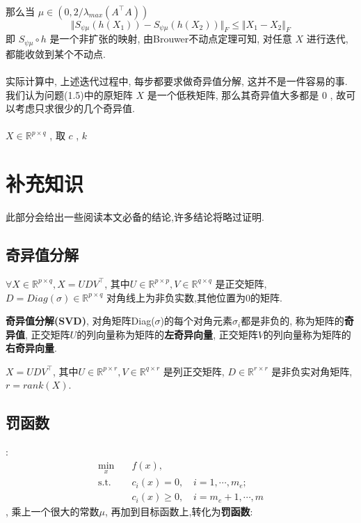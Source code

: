 \documentclass[UTF8]{ctexart}
\newcommand{\s}{\quad}
\renewcommand{\b}{\textbf}
\newcommand{\p}{\paragraph{}\s}
\newcommand{\sect}{\section}
\newcommand{\ssect}{\subsection}
\newcommand{\equSplit}[1]{\begin{equation}\begin{split}#1\end{split}\end{equation}}
\newcommand{\Tst}{\text{s.t.}\s}
\newcommand{\Real}[1]{\mathbb{R}^{#1}}
\numberwithin{equation}{section}
\begin{document}
		\paragraph{}\quad 那么当 $\mu \in (0, 2/\lambda_{max}(A ^\top A))$
			\begin{equation}
				\Vert{S_{\psi \mu}(h(X_1)) - S_{\psi \mu}(h(X_2))}\Vert_F \le \Vert{X_1 - X_2}\Vert_F
			\end{equation}
			即 $S_{\psi \mu} \circ h$ 是一个非扩张的映射, 由Brouwer不动点定理可知, 对任意 $X$ 进行迭代, 都能收敛到某个不动点.

		\paragraph{}\quad 实际计算中, 上述迭代过程中, 每步都要求做奇异值分解, 这并不是一件容易的事. 我们认为问题(1.5)中的原矩阵 $X$ 是一个低秩矩阵, 那么其奇异值大多都是 $0$ , 故可以考虑只求很少的几个奇异值.

		\paragraph{}\quad $X \in \Real{p \times q}$ , 取 $c$ , $k$ 



		
	\sect{补充知识}
		此部分会给出一些阅读本文必备的结论,许多结论将略过证明.
		\ssect{奇异值分解}
		$\forall X\in\Real{p\times q},X=UDV^\top$,
		其中$U\in\Real{p\times p},V\in\Real{q\times q}$
		是正交矩阵,
		$D=Diag(\sigma)\in\Real{p\times q}$
		对角线上为非负实数,其他位置为0的矩阵.

		\b{奇异值分解(SVD)},
		对角矩阵Diag($\sigma$)的每个对角元素$\sigma_i$都是非负的,
		称为矩阵的\b{奇异值},
		正交矩阵$U$的列向量称为矩阵的\b{左奇异向量},
		正交矩阵$V$的列向量称为矩阵的\b{右奇异向量}.

		$X=UDV^\top$,
		其中$U\in\Real{p\times r},V\in\Real{q\times r}$
		是列正交矩阵,
		$D\in\Real{r\times r}$
		是非负实对角矩阵,
		$r=rank(X)$.

		\ssect{罚函数}
		:
		\equSplit{
			\min_x\s&f(x),\\
			\Tst&c_i(x)=0,\s i=1,\cdots,m_e;\\
			&c_i(x)\geq 0,\s i=m_e+1,\cdots,m
		}
		,
		乘上一个很大的常数$\mu$,
		再加到目标函数上,转化为\b{罚函数}:
\end{document}
